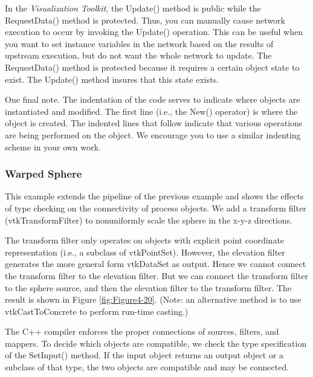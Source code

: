 In the \emph{Visualization Toolkit}, the Update() method is public while the RequestData() method is protected. Thus, you can manually cause network execution to occur by invoking the Update() operation. This can be useful when you want to set instance variables in the network based on the results of upstream execution, but do not want the whole network to update. The RequestData() method is protected because it requires a certain object state to exist. The Update() method insures that this state exists.

One final note. The indentation of the code serves to indicate where objects are instantiated and modified. The first line (i.e., the New() operator) is where the object is created. The indented lines that follow indicate that various operations are being performed on the object. We encourage you to use a similar indenting scheme in your own work.

\subsubsection{Warped Sphere}
\label{subsubsec:warped_sphere}

This example extends the pipeline of the previous example and shows the effects of type checking on the connectivity of process objects. We add a transform filter (vtkTransformFilter) to nonuniformly scale the sphere in the x-y-z directions.

The transform filter only operates on objects with explicit point coordinate representation (i.e., a subclass of vtkPointSet). However, the elevation filter generates the more general form vtkDataSet as output. Hence we cannot connect the transform filter to the elevation filter. But we can connect the transform filter to the sphere source, and then the elevation filter to the transform filter. The result is shown in Figure \ref{fig:Figure4-20}. (Note: an alternative method is to use vtkCastToConcrete to perform run-time casting.)

The C++ compiler enforces the proper connections of sources, filters, and mappers. To decide which objects are compatible, we check the type specification of the SetInput() method. If the input object returns an output object or a subclass of that type, the two objects are compatible and may be connected.

